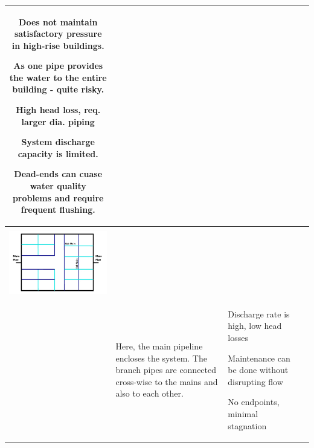 \documentclass{article}
\begin{document}
\begin{table}[H]
\begin{tabular}{ | c m{4cm} | m{3.1cm} |  m{3.1cm} |}
\begin{itemize}[leftmargin=*]
      \scriptsize{
        \item Does not maintain satisfactory pressure in high-rise buildings.
        \item As one pipe provides the water to the entire building  - quite risky.
        \item High head loss, req. larger dia. piping
        \item System discharge capacity is limited.
        \item Dead-ends can cuase water quality problems and require frequent flushing.}
      \end{itemize}
    \\ \hline
    \begin{minipage}{.3\textwidth}
    \scriptsize{\textbf{Ring Distribution System}}\\
     \includegraphics[scale=0.24]{RingDistributionSystem}\\
    \end{minipage}
    &
  \scriptsize{Here, the main pipeline encloses the system.  The branch pipes are connected cross-wise to the mains and also to each other.}  
    &
        \vspace{0.4cm}
      \begin{itemize}[leftmargin=*]
      \scriptsize{
        \item Discharge rate is high, low head losses
        \item Maintenance can be done without disrupting flow
        \item No endpoints, minimal stagnation}

\end{itemize}
\end{tabular}
\end{table}
\end{document}
